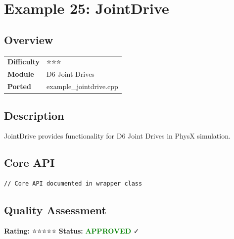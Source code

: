 \section{Example 25: JointDrive}
\subsection{Overview}
\begin{table}[h]
\centering
\begin{tabular}{|l|l|}
\hline
\textbf{Difficulty} & ⭐⭐⭐ \\
\textbf{Module} & D6 Joint Drives \\
\textbf{Ported} & example\_jointdrive.cpp \\
\hline
\end{tabular}
\end{table}

\subsection{Description}
JointDrive provides functionality for D6 Joint Drives in PhysX simulation.

\subsection{Core API}
\begin{lstlisting}
// Core API documented in wrapper class
\end{lstlisting}

\subsection{Quality Assessment}
\textbf{Rating:} ⭐⭐⭐⭐⭐ \quad \textbf{Status:} \textcolor{green}{\textbf{APPROVED}} ✓
